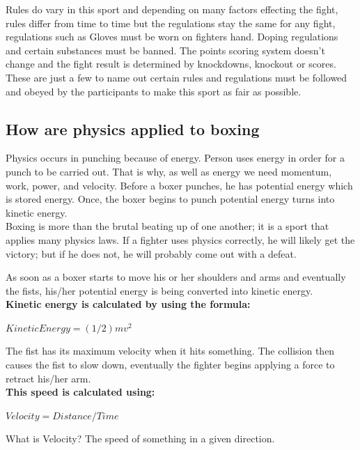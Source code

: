 \documentclass[a4paper,12pt,twoside]{report}
\begin{document}
Rules do vary in this sport and depending on many factors effecting the fight, rules differ from time to time but the regulations stay the same for any fight, regulations such as
Gloves must be worn on fighters hand.
Doping regulations and certain substances must be banned.
The points scoring system doesn't change and the fight result is determined by knockdowns, knockout or scores.
These are just a few to name out certain rules and regulations must be followed and obeyed by the participants to make this sport as fair as possible. 

\newpage
\subsection{How are physics applied to boxing}
Physics occurs in punching because of energy. Person uses energy in order for a punch to be carried out. That is why, as well as energy we need momentum, work, power, and velocity. Before a boxer punches, he has potential energy which is stored energy. Once, the boxer begins to punch potential energy turns into kinetic energy.\\
Boxing is more than the brutal beating up of one another; it is a sport that applies many physics laws. If a fighter uses physics correctly, he will likely get the victory; but if he does not, he will probably come out with a defeat.

As soon as a boxer starts to move his or her shoulders and arms and eventually the fists, his/her potential energy is being converted into kinetic energy.\\

\textbf{Kinetic energy is calculated by using the formula:}

$Kinetic Energy = (1/2)mv^2$

The fist has its maximum velocity when it hits something. The collision then causes the fist to slow down, eventually the fighter begins applying a force to retract his/her arm.\\

\textbf{This speed is calculated using:}

$Velocity = Distance / Time$

What is Velocity? The speed of something in a given direction.\cite{boxPhysics}
\end{document}
